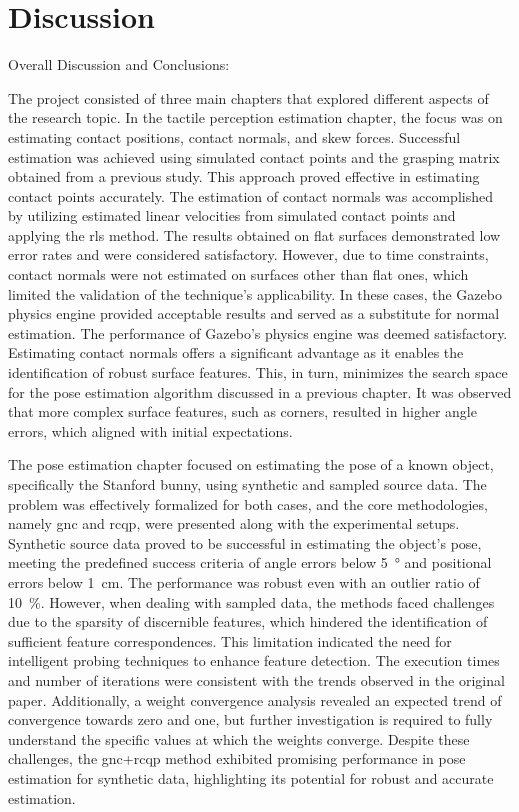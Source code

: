 \chapter{Discussion}\label{ch:discussion}


Overall Discussion and Conclusions:

The project consisted of three main chapters that explored different aspects of the research topic. In the tactile perception estimation chapter, the focus was on estimating contact positions, contact normals, and skew forces. Successful estimation was achieved using simulated contact points and the grasping matrix obtained from a previous study. This approach proved effective in estimating contact points accurately. The estimation of contact normals was accomplished by utilizing estimated linear velocities from simulated contact points and applying the \gls{rls} method. The results obtained on flat surfaces demonstrated low error rates and were considered satisfactory. However, due to time constraints, contact normals were not estimated on surfaces other than flat ones, which limited the validation of the technique's applicability. In these cases, the Gazebo physics engine provided acceptable results and served as a substitute for normal estimation. The performance of Gazebo's physics engine was deemed satisfactory. Estimating contact normals offers a significant advantage as it enables the identification of robust surface features. This, in turn, minimizes the search space for the pose estimation algorithm discussed in a previous chapter. It was observed that more complex surface features, such as corners, resulted in higher angle errors, which aligned with initial expectations.

The pose estimation chapter focused on estimating the pose of a known object, specifically the Stanford bunny, using synthetic and sampled source data. The problem was effectively formalized for both cases, and the core methodologies, namely \gls{gnc} and \gls{rcqp}, were presented along with the experimental setups. Synthetic source data proved to be successful in estimating the object's pose, meeting the predefined success criteria of angle errors below \SI{5}{\degree} and positional errors below \SI{1}{cm}. The performance was robust even with an outlier ratio of \SI{10}{\percent}. However, when dealing with sampled data, the methods faced challenges due to the sparsity of discernible features, which hindered the identification of sufficient feature correspondences. This limitation indicated the need for intelligent probing techniques to enhance feature detection. The execution times and number of iterations were consistent with the trends observed in the original paper. Additionally, a weight convergence analysis revealed an expected trend of convergence towards zero and one, but further investigation is required to fully understand the specific values at which the weights converge. Despite these challenges, the \gls{gnc}+\gls{rcqp} method exhibited promising performance in pose estimation for synthetic data, highlighting its potential for robust and accurate estimation.

